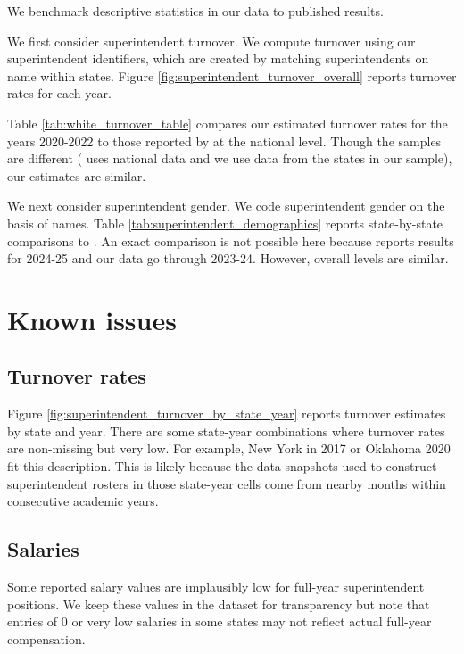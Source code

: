 \documentclass[12pt]{article}
\begin{document}
We benchmark descriptive statistics in our data to published results. 

We first consider superintendent turnover. We compute turnover using our superintendent identifiers, which are created by matching superintendents on name within states. Figure \ref{fig:superintendent_turnover_overall}  reports turnover rates for each year. 

Table \ref{tab:white_turnover_table} compares our estimated turnover rates for the years 2020-2022 to those reported by \citet{white} at the national level. Though the samples are different (\citet{white} uses national data and we use data from the states in our sample), our estimates are similar.  

We next consider superintendent gender. We code superintendent gender on the basis of names. Table \ref{tab:superintendent_demographics} reports state-by-state comparisons to \citet{superintendentlab}. An exact comparison is not possible here because \citet{superintendentlab} reports results for 2024-25 and our data go through 2023-24. However, overall levels are similar. 

\section{Known issues}

\subsection{Turnover rates}
Figure \ref{fig:superintendent_turnover_by_state_year} reports turnover estimates by state and year. There are some state-year combinations where turnover rates are non-missing but very low. For example,  New York in 2017 or Oklahoma 2020 fit this description. This is likely because the data snapshots used to construct superintendent rosters in those state-year cells come from nearby months  within consecutive academic years. 

\subsection{Salaries}
Some reported salary values are implausibly low for full-year superintendent positions. We keep these values in the dataset for transparency but note that entries of 0 or very low salaries in some states may not reflect actual full-year compensation.
\end{document}
